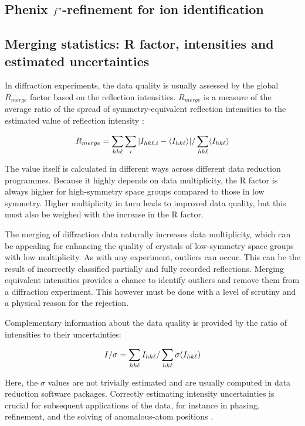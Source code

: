 \subsection{Phenix $f"$-refinement for ion identification}

\subsection{Merging statistics: R factor, intensities and estimated uncertainties}

In diffraction experiments, the data quality is usually assessed by the global $R_{merge}$ factor based on the reflection intensities. $R_{merge}$ is a measure of the average ratio of the spread of symmetry-equivalent reflection intensities to the estimated value of reflection intensity \cite{Dauter1999}:

\begin{equation}
    R_{merge} = \sum_{hk\ell}\sum_i | I_{hk\ell,i} - \langle I_{hk\ell} \rangle | / \sum_{hk\ell} \langle I_{hk\ell} \rangle
\end{equation}

The value itself is calculated in different ways across different data reduction programmes. Because it highly depends on data multiplicity, the R factor is always higher for high-symmetry space groups compared to those in low symmetry. Higher multiplicity in turn leads to improved data quality, but this must also be weighed with the increase in the R factor.

The merging of diffraction data naturally increases data multiplicity, which can be appealing for enhancing the quality of crystals of low-symmetry space groups with low multiplicity. As with any experiment, outliers can occur. This can be the result of incorrectly classified partially and fully recorded reflections. Merging equivalent intensities provides a chance to identify outliers and remove them from a diffraction experiment. This however must be done with a level of scrutiny and a physical reason for the rejection.

Complementary information about the data quality is provided by the ratio of intensities to their uncertainties:

\begin{equation}
    I / \sigma = \sum_{hk\ell} I_{hk\ell}/\sum_{hk\ell} \sigma(I_{hk\ell})
\end{equation}

Here, the $\sigma$ values are not trivially estimated and are usually computed in data reduction software packages. Correctly estimating intensity uncertainties is crucial for subsequent applications of the data, for instance in phasing, refinement, and the solving of anomalous-atom positions \cite{Dauter1999}.  

